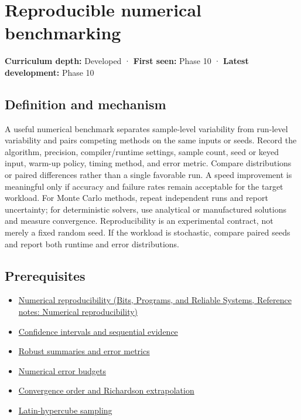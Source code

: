 \hypertarget{appendix-b9db93e28371}{}\label{referencestart:appendix-b9db93e28371}
\section{Reproducible numerical benchmarking}\label{appendix-b9db93e28371-reproducible-numerical-benchmarking}

\textbf{Curriculum depth:} Developed · \textbf{First seen:} Phase 10 · \textbf{Latest development:} Phase 10

\subsection{Definition and mechanism}\label{appendix-b9db93e28371-definition-and-mechanism}

A useful numerical benchmark separates sample-level variability from run-level variability and pairs competing methods on the same inputs or seeds. Record the algorithm, precision, compiler/runtime settings, sample count, seed or keyed input, warm-up policy, timing method, and error metric. Compare distributions or paired differences rather than a single favorable run. A speed improvement is meaningful only if accuracy and failure rates remain acceptable for the target workload. For Monte Carlo methods, repeat independent runs and report uncertainty; for deterministic solvers, use analytical or manufactured solutions and measure convergence. Reproducibility is an experimental contract, not merely a fixed random seed. If the workload is stochastic, compare paired seeds and report both runtime and error distributions.

\subsection{Prerequisites}\label{appendix-b9db93e28371-prerequisites}

\begin{itemize}
\tightlist
\item
  \href{../01-Bits-Programs-and-Reliable-Systems/main.pdf\#nameddest=appendix-5f1a2c3f97ff}{Numerical reproducibility (Bits, Programs, and Reliable Systems, Reference notes: Numerical reproducibility)}
\item
  \hyperref[appendix-c83016554b1e]{Confidence intervals and sequential evidence}
\item
  \hyperref[appendix-bcc44e9d3d02]{Robust summaries and error metrics}
\item
  \hyperref[appendix-31b8c295e05f]{Numerical error budgets}
\item
  \hyperref[appendix-aca80b6bf17a]{Convergence order and Richardson extrapolation}
\item
  \hyperref[appendix-1c5e85693a06]{Latin-hypercube sampling}
\end{itemize}


